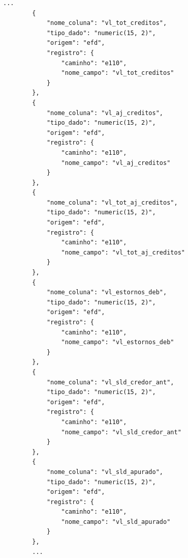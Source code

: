 \begin{quadro}[H]
    \centering

\begin{lstlisting}[basicstyle=\ttfamily\footnotesize, frame=single]
        ...
        {
            "nome_coluna": "vl_tot_creditos",
            "tipo_dado": "numeric(15, 2)",
            "origem": "efd",
            "registro": {
                "caminho": "e110",
                "nome_campo": "vl_tot_creditos"
            }
        },
        {
            "nome_coluna": "vl_aj_creditos",
            "tipo_dado": "numeric(15, 2)",
            "origem": "efd",
            "registro": {
                "caminho": "e110",
                "nome_campo": "vl_aj_creditos"
            }
        },
        {
            "nome_coluna": "vl_tot_aj_creditos",
            "tipo_dado": "numeric(15, 2)",
            "origem": "efd",
            "registro": {
                "caminho": "e110",
                "nome_campo": "vl_tot_aj_creditos"
            }
        },
        {
            "nome_coluna": "vl_estornos_deb",
            "tipo_dado": "numeric(15, 2)",
            "origem": "efd",
            "registro": {
                "caminho": "e110",
                "nome_campo": "vl_estornos_deb"
            }
        },
        {
            "nome_coluna": "vl_sld_credor_ant",
            "tipo_dado": "numeric(15, 2)",
            "origem": "efd",
            "registro": {
                "caminho": "e110",
                "nome_campo": "vl_sld_credor_ant"
            }
        },
        {
            "nome_coluna": "vl_sld_apurado",
            "tipo_dado": "numeric(15, 2)",
            "origem": "efd",
            "registro": {
                "caminho": "e110",
                "nome_campo": "vl_sld_apurado"
            }
        },
        ...
\end{lstlisting}
\end{quadro}
